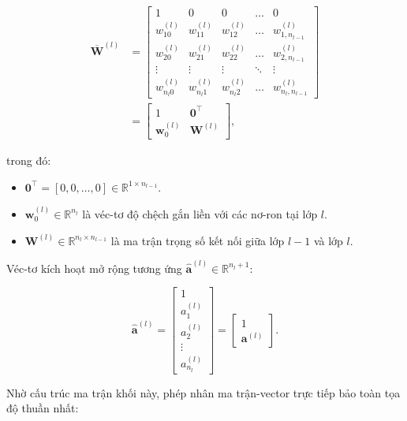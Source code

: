 \begin{align}
    \overline{\mathbf{W}}^{(l)} &= \begin{bmatrix}
        1 & 0 & 0 & \dots & 0 \\
        w_{10}^{(l)} & w_{11}^{(l)} & w_{12}^{(l)} & \dots & w_{1, n_{l-1}}^{(l)} \\
        w_{20}^{(l)} & w_{21}^{(l)} & w_{22}^{(l)} & \dots & w_{2, n_{l-1}}^{(l)} \\
        \vdots & \vdots & \vdots & \ddots & \vdots \\
        w_{n_l 0}^{(l)} & w_{n_l 1}^{(l)} & w_{n_l 2}^{(l)} & \dots & w_{n_l, n_{l-1}}^{(l)}
    \end{bmatrix} \nonumber \\
    &= \begin{bmatrix}
        1 & \mathbf{0}^\top \\
        \mathbf{w}_0^{(l)} & \mathbf{W}^{(l)}
    \end{bmatrix},
\end{align}

trong đó:
\begin{itemize}
    \item $\mathbf{0}^\top = [0, 0, \dots, 0] \in \mathbb{R}^{1 \times n_{l-1}}$.
    \item $\mathbf{w}_0^{(l)} \in \mathbb{R}^{n_l}$ là véc-tơ độ chệch gắn liền với các nơ-ron tại lớp $l$.
    \item $\mathbf{W}^{(l)} \in \mathbb{R}^{n_l \times n_{l-1}}$ là ma trận trọng số kết nối giữa lớp $l-1$ và lớp $l$.
\end{itemize}

Véc-tơ kích hoạt mở rộng tương ứng $\hat{\mathbf{a}}^{(l)} \in \mathbb{R}^{n_l + 1}$:

\begin{equation}
    \hat{\mathbf{a}}^{(l)} = \begin{bmatrix} 
        1 \\ 
        a_1^{(l)} \\ 
        a_2^{(l)} \\ 
        \vdots \\ 
        a_{n_l}^{(l)} 
    \end{bmatrix} = \begin{bmatrix} 1 \\ \mathbf{a}^{(l)} \end{bmatrix}.
\end{equation}

Nhờ cấu trúc ma trận khối này, phép nhân ma trận-vector trực tiếp bảo toàn tọa độ thuần nhất:

